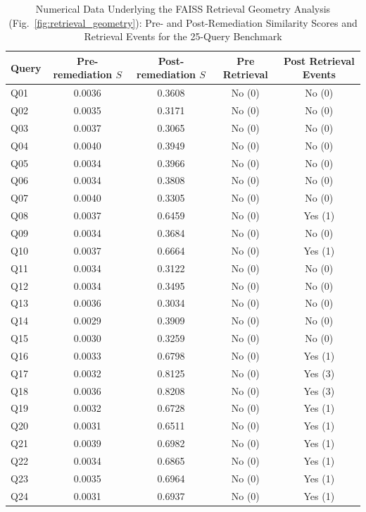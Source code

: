 \begin{table}[t]
\centering
\caption{Numerical Data Underlying the FAISS Retrieval Geometry Analysis (Fig.~\ref{fig:retrieval_geometry}): Pre- and Post-Remediation Similarity Scores and Retrieval Events for the 25-Query Benchmark}
\label{tab:fig3_validation}
\footnotesize
\setlength{\tabcolsep}{16pt}
\renewcommand{\arraystretch}{1.03}
\begin{tabular}{l c c c c}
\toprule
\textbf{Query} & \textbf{Pre-remediation $S$} & \textbf{Post-remediation $S$} & \textbf{Pre Retrieval} & \textbf{Post Retrieval Events} \\
\midrule
Q01 & 0.0036 & 0.3608 & No (0) & No (0) \\
Q02 & 0.0035 & 0.3171 & No (0) & No (0) \\
Q03 & 0.0037 & 0.3065 & No (0) & No (0) \\
Q04 & 0.0040 & 0.3949 & No (0) & No (0) \\
Q05 & 0.0034 & 0.3966 & No (0) & No (0) \\
Q06 & 0.0034 & 0.3808 & No (0) & No (0) \\
Q07 & 0.0040 & 0.3305 & No (0) & No (0) \\
Q08 & 0.0037 & 0.6459 & No (0) & Yes (1) \\
Q09 & 0.0034 & 0.3684 & No (0) & No (0) \\
Q10 & 0.0037 & 0.6664 & No (0) & Yes (1) \\
Q11 & 0.0034 & 0.3122 & No (0) & No (0) \\
Q12 & 0.0034 & 0.3495 & No (0) & No (0) \\
Q13 & 0.0036 & 0.3034 & No (0) & No (0) \\
Q14 & 0.0029 & 0.3909 & No (0) & No (0) \\
Q15 & 0.0030 & 0.3259 & No (0) & No (0) \\
Q16 & 0.0033 & 0.6798 & No (0) & Yes (1) \\
Q17 & 0.0032 & 0.8125 & No (0) & Yes (3) \\
Q18 & 0.0036 & 0.8208 & No (0) & Yes (3) \\
Q19 & 0.0032 & 0.6728 & No (0) & Yes (1) \\
Q20 & 0.0031 & 0.6511 & No (0) & Yes (1) \\
Q21 & 0.0039 & 0.6982 & No (0) & Yes (1) \\
Q22 & 0.0034 & 0.6865 & No (0) & Yes (1) \\
Q23 & 0.0035 & 0.6964 & No (0) & Yes (1) \\
Q24 & 0.0031 & 0.6937 & No (0) & Yes (1) \\

\end{tabular}
\end{table}
